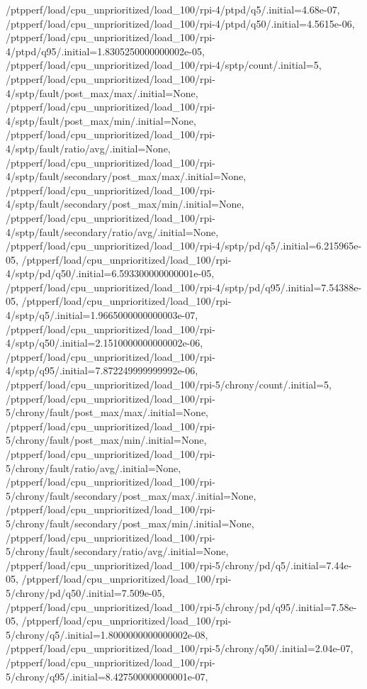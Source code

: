 {    /ptpperf/load/cpu_unprioritized/load_100/rpi-4/ptpd/q5/.initial=4.68e-07,
    /ptpperf/load/cpu_unprioritized/load_100/rpi-4/ptpd/q50/.initial=4.5615e-06,
    /ptpperf/load/cpu_unprioritized/load_100/rpi-4/ptpd/q95/.initial=1.8305250000000002e-05,
    /ptpperf/load/cpu_unprioritized/load_100/rpi-4/sptp/count/.initial=5,
    /ptpperf/load/cpu_unprioritized/load_100/rpi-4/sptp/fault/post_max/max/.initial=None,
    /ptpperf/load/cpu_unprioritized/load_100/rpi-4/sptp/fault/post_max/min/.initial=None,
    /ptpperf/load/cpu_unprioritized/load_100/rpi-4/sptp/fault/ratio/avg/.initial=None,
    /ptpperf/load/cpu_unprioritized/load_100/rpi-4/sptp/fault/secondary/post_max/max/.initial=None,
    /ptpperf/load/cpu_unprioritized/load_100/rpi-4/sptp/fault/secondary/post_max/min/.initial=None,
    /ptpperf/load/cpu_unprioritized/load_100/rpi-4/sptp/fault/secondary/ratio/avg/.initial=None,
    /ptpperf/load/cpu_unprioritized/load_100/rpi-4/sptp/pd/q5/.initial=6.215965e-05,
    /ptpperf/load/cpu_unprioritized/load_100/rpi-4/sptp/pd/q50/.initial=6.593300000000001e-05,
    /ptpperf/load/cpu_unprioritized/load_100/rpi-4/sptp/pd/q95/.initial=7.54388e-05,
    /ptpperf/load/cpu_unprioritized/load_100/rpi-4/sptp/q5/.initial=1.9665000000000003e-07,
    /ptpperf/load/cpu_unprioritized/load_100/rpi-4/sptp/q50/.initial=2.1510000000000002e-06,
    /ptpperf/load/cpu_unprioritized/load_100/rpi-4/sptp/q95/.initial=7.872249999999992e-06,
    /ptpperf/load/cpu_unprioritized/load_100/rpi-5/chrony/count/.initial=5,
    /ptpperf/load/cpu_unprioritized/load_100/rpi-5/chrony/fault/post_max/max/.initial=None,
    /ptpperf/load/cpu_unprioritized/load_100/rpi-5/chrony/fault/post_max/min/.initial=None,
    /ptpperf/load/cpu_unprioritized/load_100/rpi-5/chrony/fault/ratio/avg/.initial=None,
    /ptpperf/load/cpu_unprioritized/load_100/rpi-5/chrony/fault/secondary/post_max/max/.initial=None,
    /ptpperf/load/cpu_unprioritized/load_100/rpi-5/chrony/fault/secondary/post_max/min/.initial=None,
    /ptpperf/load/cpu_unprioritized/load_100/rpi-5/chrony/fault/secondary/ratio/avg/.initial=None,
    /ptpperf/load/cpu_unprioritized/load_100/rpi-5/chrony/pd/q5/.initial=7.44e-05,
    /ptpperf/load/cpu_unprioritized/load_100/rpi-5/chrony/pd/q50/.initial=7.509e-05,
    /ptpperf/load/cpu_unprioritized/load_100/rpi-5/chrony/pd/q95/.initial=7.58e-05,
    /ptpperf/load/cpu_unprioritized/load_100/rpi-5/chrony/q5/.initial=1.8000000000000002e-08,
    /ptpperf/load/cpu_unprioritized/load_100/rpi-5/chrony/q50/.initial=2.04e-07,
    /ptpperf/load/cpu_unprioritized/load_100/rpi-5/chrony/q95/.initial=8.427500000000001e-07,
}
